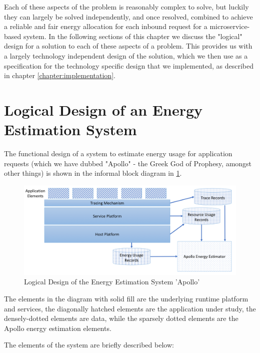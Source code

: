 Each of these aspects of the problem is reasonably complex to solve, but luckily they can largely be solved independently, and once resolved, combined to achieve a reliable and fair energy allocation for each inbound request for a microservice-based system.  In the following sections of this chapter we discuss the "logical" design for a solution to each of these aspects of a problem.  This provides us with a largely technology independent design of the solution, which we then use as a specification for the technology specific design that we implemented, as described in chapter \ref{chapter:implementation}.

\section{Logical Design of an Energy Estimation System}

The functional design of a system to estimate energy usage for application requests (which we have dubbed "Apollo" - the Greek God of Prophesy, amongst other things) is shown in the informal block diagram in \ref{figure:logicaldesign}.

\begin{figure}
\centering
\includegraphics[width=\textwidth]{Figures/estimating-energy-logical}
\caption{Logical Design of the Energy Estimation System 'Apollo'}
\label{figure:logicaldesign}
\end{figure}

The elements in the diagram with solid fill are the underlying runtime platform and services, the diagonally hatched elements are the application under study, the densely-dotted elements are data, while the sparsely dotted elements are the Apollo energy estimation elements.

The elements of the system are briefly described below:

